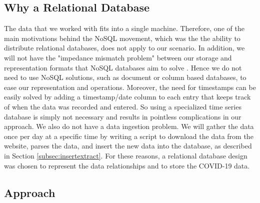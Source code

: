 \documentclass[11pt]{article}
\begin{document}
\subsection{Why a Relational Database}
\label{subsec:why}


\noindent
The data that we worked with fits into a single machine. Therefore, one of the main motivations behind the NoSQL movement, which was the the ability to distribute relational databases, does not apply to our scenario. In addition, we will not have the "impedance mismatch problem" between our storage and representation formats that NoSQL databases aim to solve \cite{nosqlTalk}. Hence we do not need to use NoSQL solutions, such as document or column based databases, to ease our representation and operations. Moreover, the need for timestamps can be easily solved by adding a timestamp/date column to each entry that keeps track of when the data was recorded and entered. So using a specialized time series database is simply not necessary and results in pointless complications in our approach. We also do not have a data ingestion problem. We will gather the data once per day at a specific time by writing a script to download the data from the website, parses the data, and insert the new data into the database, as described in Section \ref{subsec:insertextract}. For these reasons, a relational database design was chosen to represent the data relationships and to store the COVID-19 data. \\


\subsection{Approach}
\label{subsec:approach}
\end{document}
